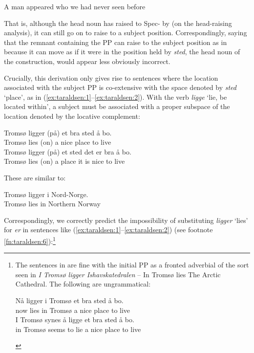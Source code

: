 \documentclass[output=paper]{LSP/langsci}
\begin{document}
\ea%
    \label{ex:taraldsen:58}
	  A man appeared who we had never seen before
\z

That is, although the head noun has raised to Spec- by  (on the head-raising analysis), it can still go on to raise to a subject position. Correspondingly, saying that the remnant containing the PP can raise to the subject position as in  because it can move as if it were in the position held by \textit{sted}, the head noun of the  construction, would appear less obviously incorrect.

Crucially, this derivation only gives rise to sentences where the location associated with the subject PP is co-extensive with the space denoted by \textit{sted} `place', as in (\ref{ex:taraldsen:1}--\ref{ex:taraldsen:2}). With the verb \textit{ligge} `lie, be located within', a subject must be associated with a proper subspace of the location denoted by the locative complement:

\ea%
    \label{ex:taraldsen:59}
  \ea
\gll  Tromsø ligger (på) et bra sted å bo.\\
          Tromsø lies     (on) a nice place to live\\
\ex
\gll   Tromsø ligger (på) et sted det er bra å bo.\\
          Tromsø  lies   (on) a  place it is nice to live\\
\z
\z

These are similar to:

\ea%
    \label{ex:taraldsen:60}
  \gll	  Tromsø ligger i Nord-Norge.\\
         Tromsø lies   in Northern Norway\\
\z

\newpage 
Correspondingly, we correctly predict the impossibility of substituting \textit{ligger} `lies' for \textit{er} in sentences like (\ref{ex:taraldsen:1}--\ref{ex:taraldsen:2}) (see footnote \ref{fn:taraldsen:6}):\footnote{The sentences in  are fine with the initial PP as a fronted adverbial of the sort seen in \textit{I Tromsø ligger Ishavskatedralen} – In Tromsø lies The Arctic Cathedral. The following are ungrammatical:

\begin{xlisti}[(ii)]
 \gll *  Nå ligger i Tromsø et bra sted å bo. \\
      {} now lies in Tromsø a nice place to live\\
 \gll  *  I Tromsø synes å ligge et bra sted å bo. \\
       {} in Tromsø seems to lie a nice place to live \\
\end{xlisti}}
\end{document}

